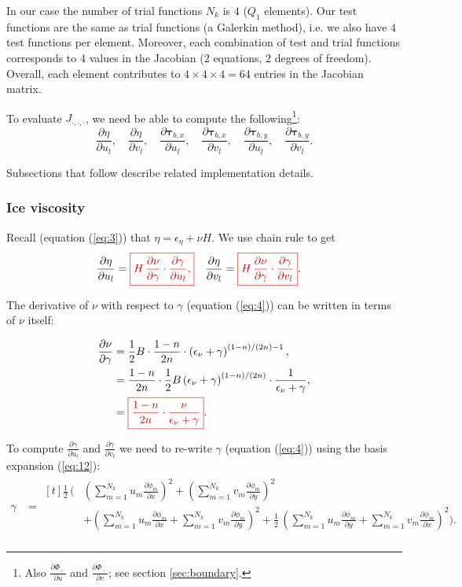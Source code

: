 \documentclass{amsart}
\newcommand{\T}{\boldsymbol{\tau}}
\newcommand{\diff}[2]{\ensuremath{\frac{\partial #1}{\partial #2}}}
\newcommand{\diffbasisexpansion}[3]{\ensuremath{\sum_{#3 = 1}^{N_k} {#1}_{#3} \diff{\phi_{#3}}{#2} }}
\newcommand{\UX}{\diffbasisexpansion{u}{x}{m}}
\newcommand{\UY}{\diffbasisexpansion{u}{y}{m}}
\newcommand{\VX}{\diffbasisexpansion{v}{x}{m}}
\newcommand{\VY}{\diffbasisexpansion{v}{y}{m}}
\newcommand{\basalshearstress}[1]{\T_{b#1}}
\newcommand{\taubx}{\basalshearstress{,x}}
\newcommand{\tauby}{\basalshearstress{,y}}
\newcommand{\highlight}[1]{{\color{red!80!black} \fbox{$ \displaystyle #1 $} }}
\begin{document}
In our case the number of trial functions $N_k$ is $4$ ($Q_1$ elements). Our test functions are the same as trial functions (a Galerkin method), i.e. we also have $4$ test functions per element. Moreover, each combination of test and trial functions corresponds to $4$ values in the Jacobian ($2$ equations, $2$ degrees of freedom). Overall, each element contributes to $4 \times 4 \times 4 = 64$ entries in the Jacobian matrix.

To evaluate $J_{\cdot,\cdot,\cdot}$, we need be able to compute the following\footnote{Also $\diff{\Phi_{\cdot,\cdot}}{u}$ and $\diff{\Phi_{\cdot,\cdot}}{v}$; see section \ref{sec:boundary}.}:
\begin{equation*}
  \diff{\eta}{u_l}, \quad \diff{\eta}{v_l}, \quad \diff{\taubx}{u_l},
  \quad \diff{\taubx}{v_l}, \quad \diff{\tauby}{u_l}, \quad \diff{\tauby}{v_l}.
\end{equation*}

Subsections that follow describe related implementation details.


\subsubsection{Ice viscosity}
\label{sec:viscosity-evaluation}

Recall (equation (\ref{eq:3})) that $\eta = \epsilon_{\eta} + \nu H$. We use chain rule to get
\begin{align*}
  \diff{\eta}{u_l} &= \highlight{ H\,\diff{\nu}{\gamma}\cdot \diff{\gamma}{u_l}, } &   \diff{\eta}{v_l} &= \highlight{ H\,\diff{\nu}{\gamma}\cdot \diff{\gamma}{v_l} }.
\end{align*}

The derivative of $\nu$ with respect to $\gamma$ (equation (\ref{eq:4})) can be written in terms of $\nu$ itself:

\begin{align*}
  \diff{\nu}{\gamma} & = \frac{1}{2} B \cdot \frac{1 - n}{2n} \cdot \left(\epsilon_{\nu} + \gamma \right)^{(1 - n) / (2n) - 1}, \\
      & = \frac{1 - n}{2n} \cdot \frac{1}{2} B \left( \epsilon_{\nu} + \gamma \right)^{(1 - n) / (2n)} \cdot \frac{1}{\epsilon_{\nu} + \gamma}, \\
      & = \highlight{ \frac{1 - n}{2n} \cdot \frac{\nu}{\epsilon_{\nu} + \gamma} }.
\end{align*}

To compute $\diff{\gamma}{u_l}$ and $\diff{\gamma}{v_l}$ we need to re-write $\gamma$ (equation (\ref{eq:4})) using the basis expansion (\ref{eq:12}):
\begin{align*}
  \gamma &=
           \begin{aligned}[t]
             \frac{1}{2}\, \Bigg(&\left(\UX\right)^2 + \left(\VY\right)^2 \\
             & + \left(\UX + \VY\right)^2 + \frac{1}{2}\, \left(\UY + \VX\right)^2\Bigg). \\
           \end{aligned}
\end{align*}
\end{document}
